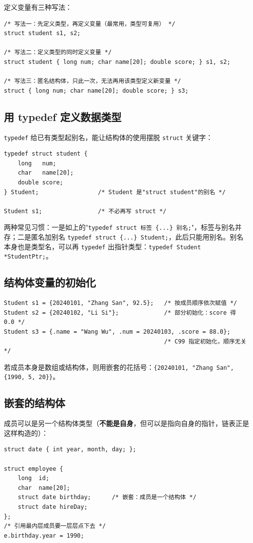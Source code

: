 定义变量有三种写法：
\begin{lstlisting}
/* 写法一：先定义类型，再定义变量（最常用，类型可复用） */
struct student s1, s2;

/* 写法二：定义类型的同时定义变量 */
struct student { long num; char name[20]; double score; } s1, s2;

/* 写法三：匿名结构体，只此一次，无法再用该类型定义新变量 */
struct { long num; char name[20]; double score; } s3;
\end{lstlisting}


\subsection{用 typedef 定义数据类型}
\texttt{typedef} 给已有类型起别名，能让结构体的使用摆脱 \texttt{struct} 关键字：
\begin{lstlisting}
typedef struct student {
    long   num;
    char   name[20];
    double score;
} Student;                 /* Student 是"struct student"的别名 */

Student s1;                /* 不必再写 struct */
\end{lstlisting}
两种常见习惯：一是如上的"\texttt{typedef struct 标签 \{...\} 别名;}"，标签与别名并存；二是匿名加别名 \texttt{typedef struct \{...\} Student;}，此后只能用别名。别名本身也是类型名，可以再 \texttt{typedef} 出指针类型：\texttt{typedef Student *StudentPtr;}。

\subsection{结构体变量的初始化}
\begin{lstlisting}
Student s1 = {20240101, "Zhang San", 92.5};   /* 按成员顺序依次赋值 */
Student s2 = {20240102, "Li Si"};             /* 部分初始化：score 得 0.0 */
Student s3 = {.name = "Wang Wu", .num = 20240103, .score = 88.0};
                                              /* C99 指定初始化，顺序无关 */
\end{lstlisting}
若成员本身是数组或结构体，则用嵌套的花括号：\texttt{\{20240101, "Zhang San", \{1990, 5, 20\}\}}。

\subsection{嵌套的结构体}
成员可以是另一个结构体类型（\textbf{不能是自身}，但可以是指向自身的指针，链表正是这样构造的）：
\begin{lstlisting}
struct date { int year, month, day; };

struct employee {
    long  id;
    char  name[20];
    struct date birthday;      /* 嵌套：成员是一个结构体 */
    struct date hireDay;
};
/* 引用最内层成员要一层层点下去 */
e.birthday.year = 1990;
\end{lstlisting}

